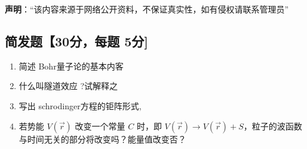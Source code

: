 
\textbf{声明}：“该内容来源于网络公开资料，不保证真实性，如有侵权请联系管理员”

\subsection{简发题【30分，每题 5分]}
\begin{enumerate}
\item 简述 Bohr量子论的基本内客
\item 什么叫隧道效应 ?试解释之
\item 写出 schrodinger方程的钜阵形式,
\item 若势能 $V(\vec{r})$ 改变一个常量 $C$ 时，即 $V(\vec{r}) \rightarrow V(\vec{r}) + S$，粒子的波函数与时间无关的部分将改变吗？能量值改变否？
\end{enumerate}
